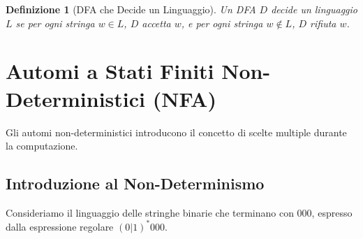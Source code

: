 \documentclass[a4paper]{article}
\newtheorem{definition}{Definizione}[section]
\begin{document}
\begin{definition}[DFA che Decide un Linguaggio]
Un DFA $D$ \emph{decide} un linguaggio $L$ se per ogni stringa $w \in L$, $D$ accetta $w$, e per ogni stringa $w \notin L$, $D$ rifiuta $w$.
\end{definition}

\section{Automi a Stati Finiti Non-Deterministici (NFA)}
Gli automi non-deterministici introducono il concetto di scelte multiple durante la computazione.

\subsection{Introduzione al Non-Determinismo}
Consideriamo il linguaggio delle stringhe binarie che terminano con $000$, espresso dalla espressione regolare $(0|1)^*000$.
\end{document}
